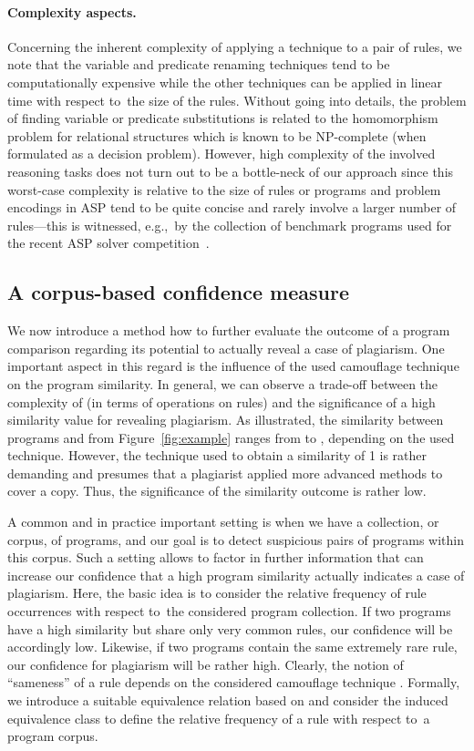 \documentclass{tlp}
\newcommand{\NP}{\mbox{\rm NP}}
\newcommand{\wrt}[0]{with respect to}
\newcommand{\egc}[0]{e.g.,\ }
\begin{document}
\paragraph{Complexity aspects.}
Concerning the inherent  complexity of applying a technique to a pair of rules, 
we note that the variable and predicate renaming techniques tend to be computationally expensive while
the other techniques can be applied in linear time \wrt\ the size of the rules.
 Without going into details,  the problem of finding variable or predicate substitutions is  related to the 
homomorphism problem for relational structures which is known to be \NP-complete (when formulated as a decision problem). However, high complexity
 of the 
involved reasoning tasks does not
turn out to be a bottle-neck of our approach since this worst-case complexity is relative to the size of rules or 
 programs and
problem encodings in ASP tend to 
be quite concise and rarely involve a larger number of rules---this is witnessed, \egc by the collection of benchmark programs
used for the recent ASP solver competition~\cite{competition09}.

\subsection{A corpus-based confidence measure}


We now introduce a method how to further evaluate the outcome of a program comparison regarding its
potential to actually reveal a  case of plagiarism.
One important aspect in this regard is the influence of the used camouflage technique  on the program similarity.
In general,
we can observe a trade-off between the complexity of  (in terms of operations on rules) and
the significance of a high similarity value for revealing plagiarism. 
As illustrated, the similarity between programs  and  from Figure~\ref{fig:example} ranges from  to , depending on the used technique.
However, the technique used to obtain a similarity of 1 is rather demanding and presumes that 
a plagiarist applied more advanced methods to cover a copy.
Thus, the significance of the similarity outcome is rather low.

A common and in practice important setting  is when we have a collection, or corpus, of programs, and our goal is
to detect suspicious pairs of programs within this corpus.  Such a setting allows to factor in further information
that can increase our confidence that a high program similarity actually indicates a case of plagiarism.  
Here, the basic idea is to consider the relative frequency of rule occurrences \wrt\ the considered program collection.
If two programs have a high similarity but share only very common rules, our confidence 
will be accordingly low. 
Likewise, if two programs contain the same extremely rare rule,
our confidence for plagiarism will be rather high.
Clearly, the notion of ``sameness'' of a rule depends on the considered camouflage technique .
Formally, we introduce a suitable equivalence relation based on   and consider the induced equivalence class to define the relative frequency of a rule \wrt\ a program corpus.
\end{document}
